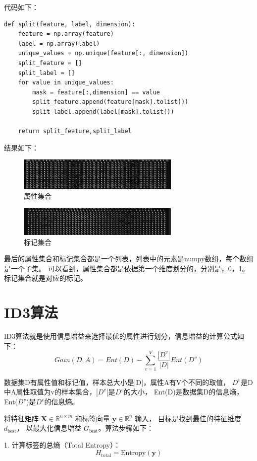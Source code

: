 \documentclass[12pt,a4paper,oneside]{article}
\begin{document}
代码如下：
\begin{lstlisting}
def split(feature, label, dimension):
    feature = np.array(feature)
    label = np.array(label)
    unique_values = np.unique(feature[:, dimension])
    split_feature = []
    split_label = []
    for value in unique_values:
        mask = feature[:,dimension] == value
        split_feature.append(feature[mask].tolist())
        split_label.append(label[mask].tolist())

    return split_feature,split_label
\end{lstlisting}

结果如下：
\begin{figure}[H]
    \centering
    \includegraphics[width=0.7\textwidth]{image/2.png}
    \caption{属性集合}
\end{figure}

\begin{figure}[H]
    \centering
    \includegraphics[width=0.7\textwidth]{image/3.png}
    \caption{标记集合}
\end{figure}

最后的属性集合和标记集合都是一个列表，列表中的元素是numpy数组，每个数组是一个子集。
可以看到，属性集合都是依据第一个维度划分的，分别是，0，1。标记集合就是对应的标记。
\section{ID3算法}
\qquad ID3算法就是使用信息增益来选择最优的属性进行划分，信息增益的计算公式如下：
$$Gain(D,A)=Ent(D)-\sum_{v=1}^V \frac{|D^v|}{|D|}Ent(D^v)$$

数据集D有属性值和标记值，样本总大小是|D|，属性A有V个不同的取值，
$D^v$是D中A属性取值为v的样本集合，$|D^v|$是$D^v$的大小，
Ent(D)是数据集D的信息熵，Ent($D^v$)是$D^v$的信息熵。

将特征矩阵 $\mathbf{X} \in \mathbb{R}^{n \times m}$ 
和标签向量 $\mathbf{y} \in \mathbb{R}^{n}$ 输入，
目标是找到最佳的特征维度 $d_{\text{best}}$，
以最大化信息增益 $G_{\text{best}}$。算法步骤如下：

1. 计算标签的总熵（Total Entropy）：
   \[
   H_{\text{total}} = \text{Entropy}(\mathbf{y})
   \]
\end{document}
